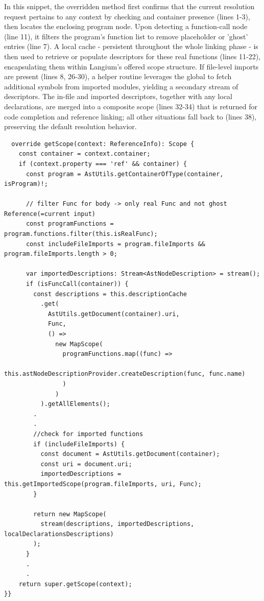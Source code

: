 In this snippet, the overridden  method first confirms that the current resolution request pertains to any  context by checking
 and container presence (lines 1-3), then locates the enclosing program node. Upon detecting a function-call node (line 11), it filters the program's
function list to remove placeholder or 'ghost' entries (line 7). A local cache - persistent throughout the whole linking phase - is
then used to retrieve or populate descriptors for these real functions (lines 11-22), encapsulating them within Langium's offered scope structure. If file-level imports are present
(lines 8, 26-30), a helper routine leverages the global  to fetch additional symbols from imported modules, yielding a secondary stream of descriptors.
The in-file and imported descriptors, together with any local declarations, are merged into a composite scope (lines 32-34) that is returned for code completion and reference
linking; all other situations fall back to  (lines 38), preserving the default resolution behavior.

\begin{verbatim}
  override getScope(context: ReferenceInfo): Scope {
    const container = context.container;
    if (context.property === 'ref' && container) {
      const program = AstUtils.getContainerOfType(container, isProgram)!;

      // filter Func for body -> only real Func and not ghost Reference(=current input)
      const programFunctions = program.functions.filter(this.isRealFunc);
      const includeFileImports = program.fileImports && program.fileImports.length > 0;

      var importedDescriptions: Stream<AstNodeDescription> = stream();
      if (isFuncCall(container)) {
        const descriptions = this.descriptionCache
          .get(
            AstUtils.getDocument(container).uri,
            Func,
            () =>
              new MapScope(
                programFunctions.map((func) =>
                  this.astNodeDescriptionProvider.createDescription(func, func.name)
                )
              )
          ).getAllElements();
        .
        .      
        //check for imported functions
        if (includeFileImports) {
          const document = AstUtils.getDocument(container);
          const uri = document.uri;
          importedDescriptions = this.getImportedScope(program.fileImports, uri, Func);
        }

        return new MapScope(
          stream(descriptions, importedDescriptions, localDeclarationsDescriptions)
        );
      } 
      .
      .
    return super.getScope(context);
}}
\end{verbatim}

